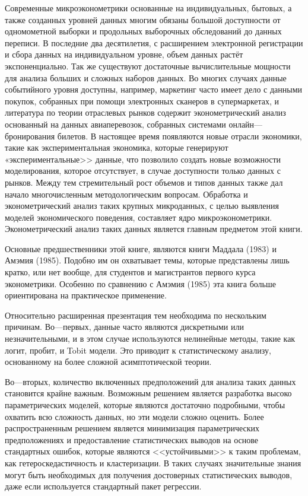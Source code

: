 	
Современные микроэконометрики основанные на индивидуальных, бытовых, а также созданных уровней данных многим обязаны большой доступности от одномометной выборки и продольных выборочных обследований до данных переписи. В последние два десятилетия, с расширением электронной регистрации и сбора данных на индивидуальном уровне, объем данных растёт экспоненциально. Так же существуют достаточные вычислительные мощности для анализа больших и сложных наборов данных. Во многих случаях данные событийного уровня доступны, например, маркетинг часто имеет дело с данными покупок, собранных при помощи электронных сканеров в супермаркетах, и литература по теории отраслевых рынков содержит эконометрический анализ основанный на данных авиаперевозок, собранных системами онлайн---бронирования билетов. В настоящее время появляются новые отрасли экономики, такие как экспериментальная экономика, которые генерируют «экспериментальные>> данные, что позволило создать новые возможности моделирования, которое отсутствует, в случае доступности только данных с рынков. Между тем стремительный рост объемов и типов данных также дал начало многочисленным методологическим вопросам. Обработка и эконометрический анализ таких крупных микроданных, с целью выявления моделей экономического поведения, составляет ядро микроэконометрики. Эконометрический анализ таких данных является главным предметом этой книги.
	
	
	Основные предшественники этой книге, являются книги Маддала (1983) и Амэмия (1985). Подобно им он охватывает темы, которые представлены лишь кратко, или нет вообще, для студентов и магистрантов первого курса эконометрики. Особенно по сравнению с Амэмия (1985) эта книга больше ориентирована на практическое применение.
	
	
	Относительно расширенная презентация тем необходима по нескольким причинам. Во---первых, данные часто являются дискретными или незначительными, и в этом случае используются нелинейные методы, такие как логит, пробит, и Tobit модели. Это приводит к статистическому анализу, основанному на более сложной асимптотической теории.
	
	
	Во---вторых, количество включенных предположений для анализа таких данных становится крайне важным. Возможным решением является разработка высоко параметрических моделей, которые являются достаточно подробными, чтобы охватить всю сложность данных, но эти модели сложно оценить. Более распространенным решением является минимизация параметрических предположениях и предоставление статистических выводов на основе стандартных ошибок, которые являются <<устойчивыми>> к таким проблемам, как гетероскедастичность и кластеризации. В таких случаях значительные знания могут быть необходимых для получения достоверных статистических выводов, даже если используется стандартный пакет регрессии.
	

